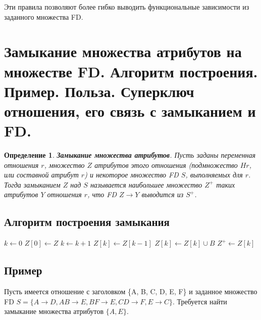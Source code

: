 \documentclass[a4paper,12pt]{article}
\newtheorem{definition}{Определение}
\begin{document}
Эти правила позволяют более гибко выводить функциональные зависимости из заданного множества FD.

\section{Замыкание множества атрибутов на множестве FD. Алгоритм построения. Пример. Польза. Суперключ отношения, его связь с замыканием и FD.}

\begin{definition}
    \textbf{Замыкание множества атрибутов}. Пусть заданы переменная отношения $r$, множество $Z$ атрибутов этого отношения (подмножество $Hr$, или составной атрибут $r$) и некоторое множество FD $S$, выполняемых для $r$. Тогда замыканием $Z$ над $S$ называется наибольшее множество $Z^+$ таких атрибутов $Y$ отношения $r$, что FD $Z \rightarrow Y$ выводится из $S^+$.
\end{definition}

\subsection{Алгоритм построения замыкания}

\begin{algorithmic}
\STATE $k \gets 0$
\STATE $Z[0] \gets Z$
\REPEAT
    \STATE $k \gets k + 1$
    \STATE $Z[k] \gets Z[k-1]$
            \STATE $Z[k] \gets Z[k] \cup B$
        \ENDIF
    \ENDFOR
{}
\STATE $Z^+ \gets Z[k]$
\end{algorithmic}

\subsection{Пример}

Пусть имеется отношение с заголовком \{A, B, C, D, E, F\} и заданное множество FD $S = \{A \rightarrow D, AB \rightarrow E, BF \rightarrow E, CD \rightarrow F, E \rightarrow C\}$. Требуется найти замыкание множества атрибутов $\{A, E\}$.
\end{document}
